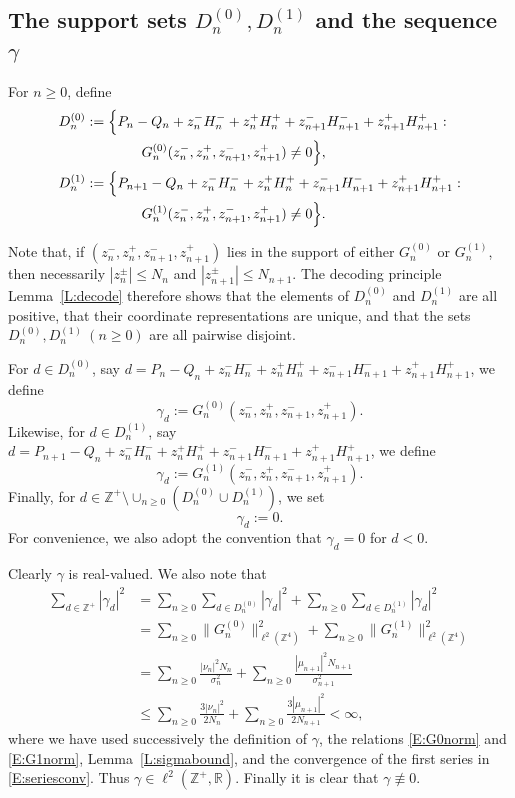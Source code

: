 \documentclass[11pt,reqno]{amsart}
\theoremstyle{plain}
\theoremstyle{definition}
\theoremstyle{remark}
\newcommand{\RR}{\mathbb{R}}
\newcommand{\ZZ}{\mathbb{Z}}
\begin{document}
\subsection{The support sets $D_n^{(0)},D_n^{(1)}$ and the sequence $\gamma$}

For $n\ge0$, define
\begin{align*}
D_n^{(0)}&:=\Bigl\{P_n-Q_n+z_n^-H_n^-+z_n^+H_n^++z_{n+1}^-H_{n+1}^-+z_{n+1}^+H_{n+1}^+:\\
&\qquad\qquad G_n^{(0)}(z_n^-,z_n^+,z_{n+1}^-,z_{n+1}^+)\ne0\Bigr\},\\
D_n^{(1)}&:=\Bigl\{P_{n+1}-Q_n+z_n^-H_n^-+z_n^+H_n^++z_{n+1}^-H_{n+1}^-+z_{n+1}^+H_{n+1}^+:\\
&\qquad\qquad G_n^{(1)}(z_n^-,z_n^+,z_{n+1}^-,z_{n+1}^+)\ne0\Bigr\}.
\end{align*}

Note that, if $(z_n^-,z_n^+,z_{n+1}^-,z_{n+1}^+)$
lies in the support of either $G_n^{(0)}$ or $G_n^{(1)}$,
then necessarily 
$|z_n^{\pm}|\le N_n$ and $|z_{n+1}^{\pm}|\le N_{n+1}$.
The decoding principle Lemma~\ref{L:decode} 
therefore shows that the 
elements of $D_n^{(0)}$ and $D_n^{(1)}$ are all positive, that their 
coordinate representations are unique, and that the sets $D_n^{(0)}, D_n^{(1)}~(n\ge0)$ are all pairwise disjoint.

For $d\in D_n^{(0)}$, say $d=P_n-Q_n+z_n^-H_n^-+z_n^+H_n^++z_{n+1}^-H_{n+1}^-+z_{n+1}^+H_{n+1}^+$, we define
\[
\gamma_d:=G_n^{(0)}(z_n^-,z_n^+,z_{n+1}^-,z_{n+1}^+).
\]
Likewise, for $d\in D_n^{(1)}$, say
$d=P_{n+1}-Q_n+z_n^-H_n^-+z_n^+H_n^++z_{n+1}^-H_{n+1}^-+z_{n+1}^+H_{n+1}^+$,
we define
\[
\gamma_d:=G_n^{(1)}(z_n^-,z_n^+,z_{n+1}^-,z_{n+1}^+).
\]
Finally, for $d\in\ZZ^+\setminus\cup_{n\ge0}(D_n^{(0)}\cup D_n^{(1)})$, we set 
\[
\gamma_d:=0.
\]
For convenience, we also adopt the convention that
$\gamma_d=0$ for $d<0$.

Clearly $\gamma$ is real-valued.
We also note that
\begin{align*}
\sum_{d\in\ZZ^+}|\gamma_d|^2
&=\sum_{n\ge0}\sum_{d\in D_n^{(0)}}|\gamma_d|^2+
\sum_{n\ge0}\sum_{d\in D_n^{(1)}}|\gamma_d|^2\\
&=\sum_{n\ge0}\|G_n^{(0)}\|_{\ell^2(\ZZ^4)}^2+\sum_{n\ge0}\|G_n^{(1)}\|_{\ell^2(\ZZ^4)}^2\\
&=\sum_{n\ge0}\frac{|\nu_n|^2N_n}{\sigma_n^2}
+\sum_{n\ge0}\frac{|\mu_{n+1}|^2N_{n+1}}{\sigma_{n+1}^2}\\
&\le  \sum_{n\ge0}\frac{3|\nu_n|^2}{2N_n}+\sum_{n\ge0}\frac{3|\mu_{n+1}|^2}{2N_{n+1}}<\infty,
\end{align*}
where we have used successively the definition of $\gamma$,
the relations \eqref{E:G0norm} and \eqref{E:G1norm},
Lemma~\ref{L:sigmabound}, and the convergence of 
the first series in \eqref{E:seriesconv}.
Thus $\gamma\in\ell^2(\ZZ^+,\RR)$.
Finally it is clear that $\gamma\not\equiv0$.
\end{document}
